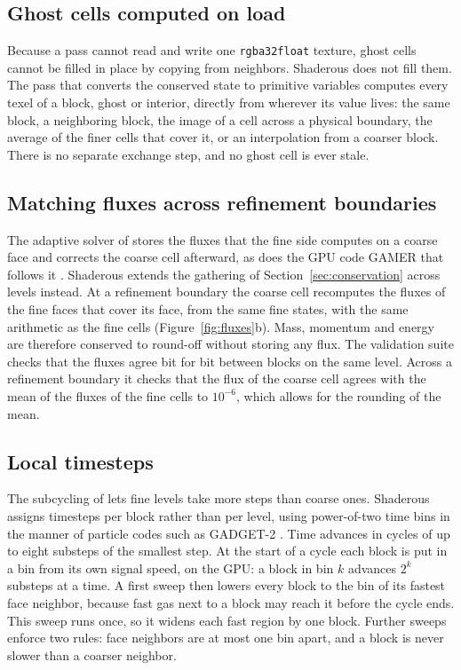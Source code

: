 \documentclass[twocolumn]{aastex701}
\begin{document}
\subsection{Ghost cells computed on load}
\label{sec:ghost}

Because a pass cannot read and write one \texttt{rgba32float} texture, ghost cells cannot be filled in place by copying from neighbors. Shaderous does not fill them. The pass that converts the conserved state to primitive variables computes every texel of a block, ghost or interior, directly from wherever its value lives: the same block, a neighboring block, the image of a cell across a physical boundary, the average of the finer cells that cover it, or an interpolation from a coarser block. There is no separate exchange step, and no ghost cell is ever stale.

\subsection{Matching fluxes across refinement boundaries}
\label{sec:reflux}

The adaptive solver of \citet{Berger1989} stores the fluxes that the fine side computes on a coarse face and corrects the coarse cell afterward, as does the GPU code GAMER that follows it \citep{Schive2010}. Shaderous extends the gathering of Section~\ref{sec:conservation} across levels instead. At a refinement boundary the coarse cell recomputes the fluxes of the fine faces that cover its face, from the same fine states, with the same arithmetic as the fine cells (Figure~\ref{fig:fluxes}b). Mass, momentum and energy are therefore conserved to round-off without storing any flux. The validation suite checks that the fluxes agree bit for bit between blocks on the same level. Across a refinement boundary it checks that the flux of the coarse cell agrees with the mean of the fluxes of the fine cells to $10^{-6}$, which allows for the rounding of the mean.

\subsection{Local timesteps}
\label{sec:timebins}

The subcycling of \citet{Berger1984} lets fine levels take more steps than coarse ones. Shaderous assigns timesteps per block rather than per level, using power-of-two time bins in the manner of particle codes such as GADGET-2 \citep{Springel2005}. Time advances in cycles of up to eight substeps of the smallest step. At the start of a cycle each block is put in a bin from its own signal speed, on the GPU: a block in bin $k$ advances $2^k$ substeps at a time. A first sweep then lowers every block to the bin of its fastest face neighbor, because fast gas next to a block may reach it before the cycle ends. This sweep runs once, so it widens each fast region by one block. Further sweeps enforce two rules: face neighbors are at most one bin apart, and a block is never slower than a coarser neighbor.
\end{document}
